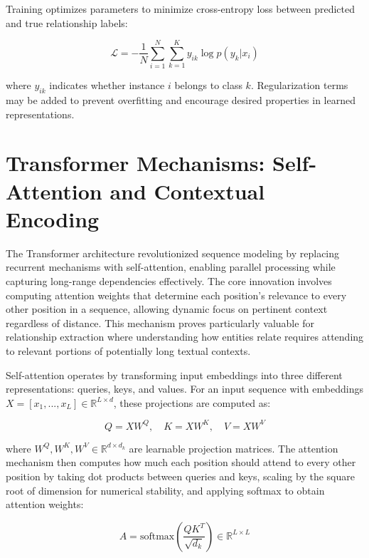 \documentclass[12pt,a4paper]{report}
\begin{document}
Training optimizes parameters to minimize cross-entropy loss between predicted and true relationship labels:

\begin{equation}
\mathcal{L} = -\frac{1}{N}\sum_{i=1}^N \sum_{k=1}^K y_{ik} \log p(y_k|x_i)
\end{equation}

where $y_{ik}$ indicates whether instance $i$ belongs to class $k$. Regularization terms may be added to prevent overfitting and encourage desired properties in learned representations.

\section{Transformer Mechanisms: Self-Attention and Contextual Encoding}

The Transformer architecture revolutionized sequence modeling by replacing recurrent mechanisms with self-attention, enabling parallel processing while capturing long-range dependencies effectively. The core innovation involves computing attention weights that determine each position's relevance to every other position in a sequence, allowing dynamic focus on pertinent context regardless of distance. This mechanism proves particularly valuable for relationship extraction where understanding how entities relate requires attending to relevant portions of potentially long textual contexts.

Self-attention operates by transforming input embeddings into three different representations: queries, keys, and values. For an input sequence with embeddings $X = [x_1, ..., x_L] \in \mathbb{R}^{L \times d}$, these projections are computed as:

\begin{equation}
Q = XW^Q, \quad K = XW^K, \quad V = XW^V
\end{equation}

where $W^Q, W^K, W^V \in \mathbb{R}^{d \times d_k}$ are learnable projection matrices. The attention mechanism then computes how much each position should attend to every other position by taking dot products between queries and keys, scaling by the square root of dimension for numerical stability, and applying softmax to obtain attention weights:

\begin{equation}
A = \text{softmax}\left(\frac{QK^T}{\sqrt{d_k}}\right) \in \mathbb{R}^{L \times L}
\end{equation}
\end{document}
